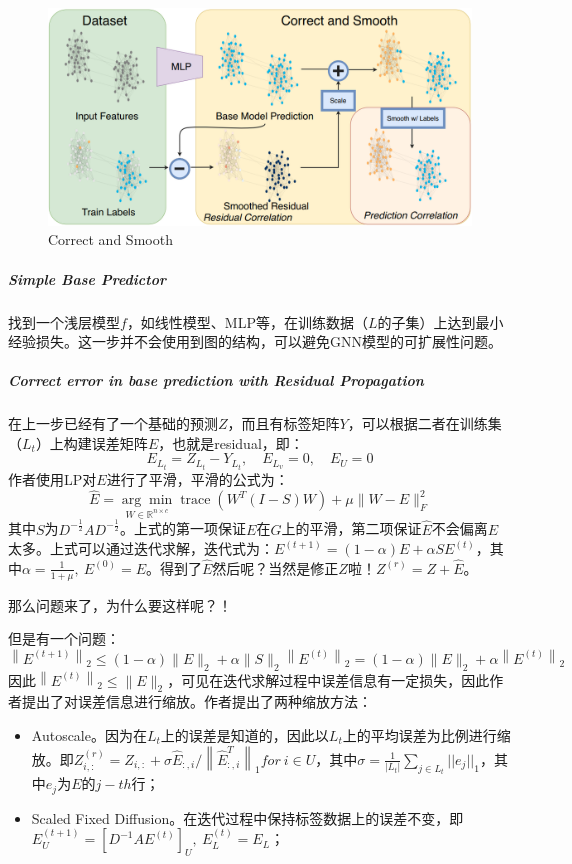 \begin{figure}[h]
	\centering
	\includegraphics[width=.8\textwidth]{pics/C&S.png}
	\caption{Correct and Smooth}
	\label{fig:C&S}
\end{figure}

\subparagraph{Simple Base Predictor}
找到一个浅层模型$f$，如线性模型、MLP等，在训练数据（$L$的子集）上达到最小经验损失。这一步并不会使用到图的结构，可以避免GNN模型的可扩展性问题。

\subparagraph{Correct error in base prediction with Residual Propagation}
在上一步已经有了一个基础的预测$Z$，而且有标签矩阵$Y$，可以根据二者在训练集（$L_t$）上构建误差矩阵$E$，也就是residual，即：
$$
E_{L_t} = Z_{L_t} - Y_{L_t},\quad E_{L_v} = 0,\quad E_{U} = 0
$$
作者使用LP对$E$进行了平滑，平滑的公式为：
$$
\hat{E}=\underset{W \in \mathbb{R}^{n \times c}}{\arg \min } \operatorname{trace}\left(W^{T}(I-S) W\right)+\mu\|W-E\|_{F}^{2}
$$
其中$S$为$D^{-\frac{1}{2}}AD^{-\frac{1}{2}}$。上式的第一项保证$E$在$G$上的平滑，第二项保证$\hat{E}$不会偏离$E$太多。上式可以通过迭代求解，迭代式为：$E^{(t+1)} = (1-\alpha)E + \alpha SE^{(t)}$，其中$\alpha = \frac{1}{1+\mu},\: E^{(0)} = E$。得到了$\hat{E}$然后呢？当然是修正$Z$啦！$Z^{(r)} = Z + \hat{E}$。

那么问题来了，为什么要这样呢？！ 

但是有一个问题：
$$
\left\|E^{(t+1)}\right\|_{2} \leq(1-\alpha)\|E\|_2 +\alpha\|S\|_{2}\left\|E^{(t)}\right\|_{2}=(1-\alpha)\|E\|_{2}+\alpha\left\|E^{(t)}\right\|_{2}
$$
因此$\left\|E^{(t)}\right\|_{2} \leq\|E\|_{2}$，可见在迭代求解过程中误差信息有一定损失，因此作者提出了对误差信息进行缩放。作者提出了两种缩放方法：
\begin{itemize}
	\item Autoscale。因为在$L_t$上的误差是知道的，因此以$L_t$上的平均误差为比例进行缩放。即$Z_{i,:}^{(r)}=Z_{i,:}+\sigma \hat{E}_{:, i} /\left\|\hat{E}_{:, i}^{T}\right\|_{1} for\:i \in U$，其中$\sigma = \frac{1}{|L_t|}\sum_{j \in L_t} ||e_j||_1$，其中$e_j$为$E$的$j-th$行；
	 
	\item Scaled Fixed Diffusion。在迭代过程中保持标签数据上的误差不变，即$E_U^{(t+1)} = [D^{-1}AE^{(t)}]_U,\: E_L^{(t)} = E_L$；
\end{itemize}

